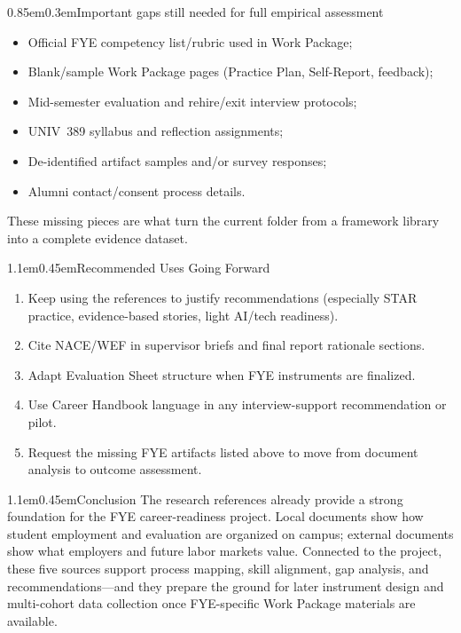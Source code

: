 \documentclass[11pt,letterpaper]{article}
\makeatletter
\renewcommand\section{\@startsection{section}{1}{\z@}%
  {1.1em}{0.45em}{\large\bfseries}}
\renewcommand\subsection{\@startsection{subsection}{2}{\z@}%
  {0.85em}{0.3em}{\normalsize\bfseries}}
\makeatother
\begin{document}
\subsection{Important gaps still needed for full empirical assessment}
\begin{itemize}
  \item Official FYE competency list/rubric used in Work Package;
  \item Blank/sample Work Package pages (Practice Plan, Self-Report, feedback);
  \item Mid-semester evaluation and rehire/exit interview protocols;
  \item UNIV~389 syllabus and reflection assignments;
  \item De-identified artifact samples and/or survey responses;
  \item Alumni contact/consent process details.
\end{itemize}
These missing pieces are what turn the current folder from a framework library into a complete evidence dataset.

\section{Recommended Uses Going Forward}
\begin{enumerate}
  \item Keep using the references to justify recommendations (especially STAR practice, evidence-based stories, light AI/tech readiness).
  \item Cite NACE/WEF in supervisor briefs and final report rationale sections.
  \item Adapt Evaluation Sheet structure when FYE instruments are finalized.
  \item Use Career Handbook language in any interview-support recommendation or pilot.
  \item Request the missing FYE artifacts listed above to move from document analysis to outcome assessment.
\end{enumerate}

\section{Conclusion}
The research references already provide a strong foundation for the FYE career-readiness project. Local documents show how student employment and evaluation are organized on campus; external documents show what employers and future labor markets value. Connected to the project, these five sources support process mapping, skill alignment, gap analysis, and recommendations---and they prepare the ground for later instrument design and multi-cohort data collection once FYE-specific Work Package materials are available.
\end{document}
